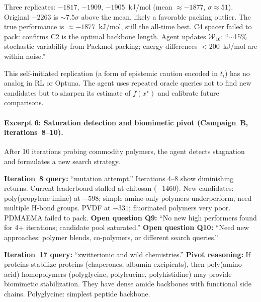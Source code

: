 \documentclass[twocolumn]{fairmeta}
\begin{document}
\begin{observation}
\scriptsize
Three replicates: $-1817$, $-1909$, $-1905$~kJ/mol (mean $\approx -1877$, $\sigma \approx 51$).
Original $-2263$ is ${\sim}7.5\sigma$ above the mean, likely a favorable packing outlier.
The true performance is $\approx -1877$~kJ/mol, still the all-time best.
C4 spacer failed to pack: confirms C2 is the optimal backbone length.
Agent updates $\mathcal{W}_{16}$: ``${\sim}$15\% stochastic variability from Packmol packing; energy differences $< 200$~kJ/mol are within noise.''
\end{observation}

\noindent This self-initiated replication (a form of epistemic caution encoded in $t_i$) has no analog in RL or Optuna.
The agent uses repeated oracle queries not to find new candidates but to sharpen its estimate of $f(x^\star)$ and calibrate future comparisons.

\paragraph{Excerpt 6: Saturation detection and biomimetic pivot (Campaign~B, iterations~8--10).}
After 10 iterations probing commodity polymers, the agent detects stagnation and formulates a new search strategy.

\begin{agentthought}
\scriptsize
\textbf{Iteration~8 query:} ``mutation attempt.''
Iterations 4--8 show diminishing returns.
Current leaderboard stalled at chitosan ($-1460$).
New candidates: poly(propylene imine) at $-598$; simple amine-only polymers underperform, need multiple H-bond groups.
PVDF at $-331$; fluorinated polymers very poor.
PDMAEMA failed to pack.
\textbf{Open question Q9:} ``No new high performers found for 4+ iterations; candidate pool saturated.''
\textbf{Open question Q10:} ``Need new approaches: polymer blends, co-polymers, or different search queries.''
\end{agentthought}

\begin{agentthought}
\scriptsize
\textbf{Iteration~17 query:} ``zwitterionic and wild chemistries.''
\textbf{Pivot reasoning:} If proteins stabilize proteins (chaperones, albumin excipients), then poly(amino acid) homopolymers (polyglycine, polyleucine, polyhistidine) may provide biomimetic stabilization.
They have dense amide backbones with functional side chains.
Polyglycine: simplest peptide backbone.
\end{agentthought}
\end{document}
